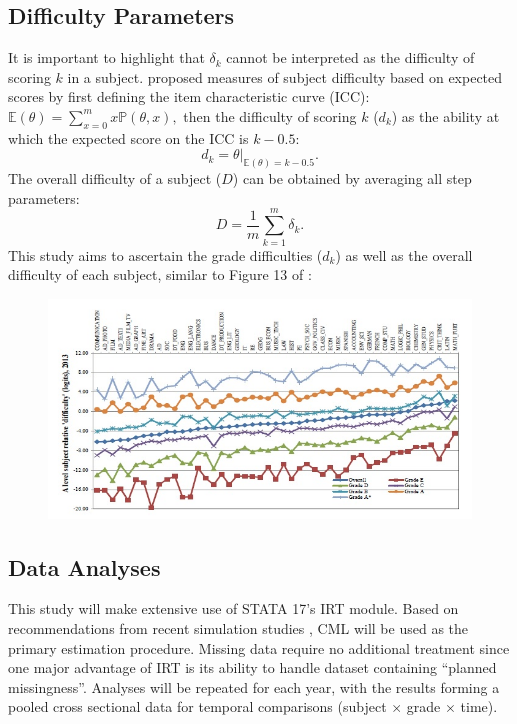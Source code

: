 \documentclass[
    a4paper,            %
    11pt,               %
    stu,                %
    donotrepeattitle,   %
    noextraspace,       %
    floatsintext,       %
    biblatex,           %
    colorlinks=true,        %
    linkcolor=red,          %
    anchorcolor=black,      %
    citecolor=blue,         %
    urlcolor=blue,          %
    bookmarks=true,         %
    bookmarksopen=false,    %
    bookmarksnumbered=true  %
]{apa7}
\newcommand{\p}[1]{\mathbb{P}\left(#1\right)}
\newcommand{\E}[1]{\mathbb{E}\left(#1\right)}
\begin{document}
\subsection{Difficulty Parameters}

It is important to highlight that $\delta_k$ cannot be interpreted as the difficulty of scoring $k$ in a subject. \textcite{wu:2007} proposed measures of subject difficulty based on expected scores by first defining the item characteristic curve (ICC):
    $ \E{\theta} = \sum_{x=0}^m x\p{\theta,x}, $
then the difficulty of scoring $k$ ($d_k$) as the ability at which the expected score on the ICC is $k-0.5$:
\begin{equation}
    d_k = \theta | _{\E{\theta} = k - 0.5}.
\end{equation}
The overall difficulty of a subject ($D$) can be obtained by averaging all step parameters:
\begin{equation}
    D = \frac{1}{m} \sum_{k=1}^m \delta_k.
\end{equation}
This study aims to ascertain the grade difficulties ($d_k$) as well as the overall difficulty of each subject, similar to Figure 13 of \textcite{he:2015}:
\begin{figure}[ht]
    \includegraphics[scale=1]{expected_result.jpg}
    \centering
\end{figure}

\subsection{Data Analyses}

This study will make extensive use of STATA 17's IRT module. Based on recommendations from recent simulation studies \parencite{christensen:2013, steinfeld:2021}, CML will be used as the primary estimation procedure. Missing data require no additional treatment since one major advantage of IRT is its ability to handle dataset containing ``planned missingness''. Analyses will be repeated for each year, with the results forming a pooled cross sectional data for temporal comparisons (subject $\times$ grade $\times$ time).


\printbibliography
\end{document}
